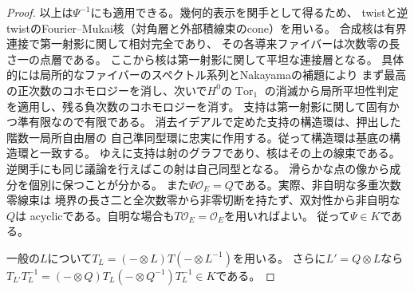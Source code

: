 \begin{proof}
以上は$\Psi^{-1}$にも適用できる。幾何的表示を関手として得るため、
twistと逆twistのFourier--Mukai核（対角層と外部積線束のcone）を用いる。
合成核は有界連接で第一射影に関して相対完全であり、
その各導来ファイバーは次数零の長さ一の点層である。
ここから核は第一射影に関して平坦な連接層となる。
具体的には局所的なファイバーのスペクトル系列とNakayamaの補題により
まず最高の正次数のコホモロジーを消し、次いで$H^0$の$\operatorname{Tor}_1$
の消滅から局所平坦性判定を適用し、残る負次数のコホモロジーを消す。
支持は第一射影に関して固有かつ準有限なので有限である。
消去イデアルで定めた支持の構造環は、押出した階数一局所自由層の
自己準同型環に忠実に作用する。従って構造環は基底の構造環と一致する。
ゆえに支持は射のグラフであり、核はその上の線束である。
逆関手にも同じ議論を行えばこの射は自己同型となる。
滑らかな点の像から成分を個別に保つことが分かる。
また$\Psi\mathcal O_E=Q$である。実際、非自明な多重次数零線束は
境界の長さ二と全次数零から非零切断を持たず、双対性から非自明な$Q$は
acyclicである。自明な場合も$T\mathcal O_E=\mathcal O_E$を用いればよい。
従って$\Psi\in K$である。

一般の$L$について$T_L=(-\otimes L)T(-\otimes L^{-1})$を用いる。
さらに$L'=Q\otimes L$なら
$T_{L'}T_L^{-1}=(-\otimes Q)T_L(-\otimes Q^{-1})T_L^{-1}\in K$である。
\end{proof}

